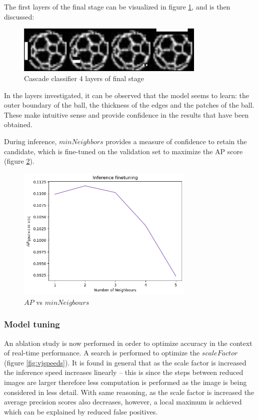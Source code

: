 \documentclass[a4paper,twoside,12pt]{report}
\begin{document}
The first layers of the final stage can be visualized in figure \ref{fig:vjlayers}, and is then discussed:

\begin{figure}[h!]
\begin{center}
\includegraphics[width=9cm]{images/vj_result.jpg}
\caption{Cascade classifier 4 layers of final stage}
\label{fig:vjlayers}
\end{center}
\end{figure}

In the layers investigated, it can be observed that the model seems to learn: the outer boundary of the ball, the thickness of the edges and the patches of the ball. These make intuitive sense and provide confidence in the results that have been obtained.

During inference, $minNeighbors$ provides a measure of confidence to retain the candidate, which is fine-tuned on the validation set to maximize the AP score (figure \ref{fig:vjneighbors}).

\begin{figure}[h!]
\begin{center}
\includegraphics[width=8.5cm]{images/vj_tune.png}
\caption{$AP$ vs $minNeigbours$}
\label{fig:vjneighbors}
\end{center}
\end{figure}

\subsubsection{Model tuning}

An ablation study is now performed in order to optimize accuracy in the context of real-time performance. A search is performed to optimize the $scaleFactor$ (figure \ref{fig:vjspeeds}). It is found in general that as the scale factor is increased the inference speed increases linearly -- this is since the steps between reduced images are larger therefore less computation is performed as the image is being considered in less detail. With same reasoning, as the scale factor is increased the average precision scores also decreases, however, a local maximum is achieved which can be explained by reduced false positives.
\end{document}
